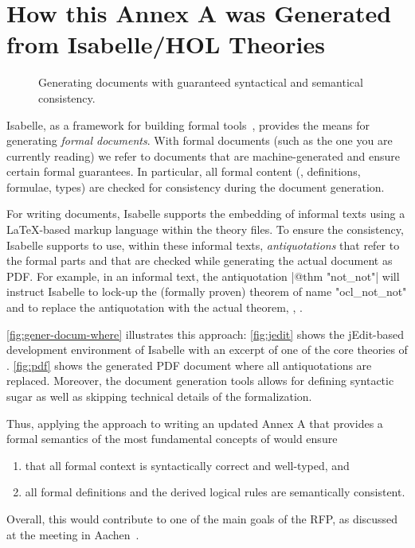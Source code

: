\section{How this Annex A was Generated from Isabelle/HOL Theories}
\begin{figure}[tb]
  \mbox{}\hfill
  \hfill%
  \hfill%
    \hfill\mbox{}
  \caption{Generating documents with guaranteed  syntactical and
    semantical consistency.}
  \label{fig:gener-docum-where}
\end{figure}
Isabelle, as a framework for building formal
tools~\cite{wenzel.ea:building:2007}, provides the means for
generating \emph{formal documents}.  With formal documents (such as
the one you are currently reading) we refer to documents that are
machine-generated and ensure certain formal guarantees. In particular,
all formal content (\eg, definitions, formulae, types) are checked for
consistency during the document generation.

For writing documents, Isabelle supports the embedding of informal
texts using a \LaTeX-based markup language within the theory files. To
ensure the consistency, Isabelle supports to use, within these
informal texts, \emph{antiquotations} that refer to the formal parts
and that are checked while generating the actual document as
PDF\@. For example, in an informal text, the antiquotation
\inlineisar|@{$\text{thm}$ "not_not"}| will instruct Isabelle to
lock-up the (formally proven) theorem of name \inlineisar"ocl_not_not"
and to replace the antiquotation with the actual theorem, \ie,
.

\autoref{fig:gener-docum-where}
illustrates this approach: \autoref{fig:jedit} shows the jEdit-based
development environment of Isabelle with an excerpt of one of the core
theories of \FOCL\@. \autoref{fig:pdf} shows the generated
PDF document where all antiquotations are replaced. Moreover,
the document generation tools allows for defining syntactic sugar as
well as skipping technical details of the formalization.


Thus, applying the  \FOCL approach to writing an updated
Annex A that provides a formal semantics of the most fundamental
concepts of \OCL would ensure
\begin{enumerate}
\item that all formal context is syntactically correct and well-typed,
  and
\item all formal definitions and the derived logical rules are
  semantically consistent.
\end{enumerate}
Overall, this would contribute to one of the main goals of the 
RFP, as discussed at the \OCL meeting in
Aachen~\cite{brucker.ea:summary-aachen:2013}.



